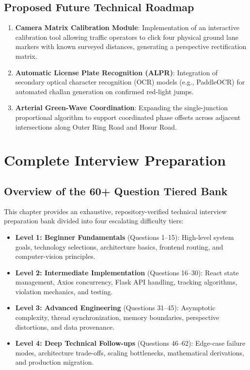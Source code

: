 \documentclass[11pt,a4paper,oneside]{report}
\begin{document}
\section{Proposed Future Technical Roadmap}
\begin{enumerate}[leftmargin=*]
    \item \textbf{Camera Matrix Calibration Module}: Implementation of an interactive calibration tool allowing traffic operators to click four physical ground lane markers with known surveyed distances, generating a perspective rectification matrix.
    \item \textbf{Automatic License Plate Recognition (ALPR)}: Integration of secondary optical character recognition (OCR) models (e.g., PaddleOCR) for automated challan generation on confirmed red-light jumps.
    \item \textbf{Arterial Green-Wave Coordination}: Expanding the single-junction proportional algorithm to support coordinated phase offsets across adjacent intersections along Outer Ring Road and Hosur Road.
\end{enumerate}



\chapter{Complete Interview Preparation}

\section{Overview of the 60+ Question Tiered Bank}
This chapter provides an exhaustive, repository-verified technical interview preparation bank divided into four escalating difficulty tiers:
\begin{itemize}[leftmargin=*]
    \item \textbf{Level 1: Beginner Fundamentals} (Questions 1--15): High-level system goals, technology selections, architecture basics, frontend routing, and computer-vision principles.
    \item \textbf{Level 2: Intermediate Implementation} (Questions 16--30): React state management, Axios concurrency, Flask API handling, tracking algorithms, violation mechanics, and testing.
    \item \textbf{Level 3: Advanced Engineering} (Questions 31--45): Asymptotic complexity, thread synchronization, memory boundaries, perspective distortions, and data provenance.
    \item \textbf{Level 4: Deep Technical Follow-ups} (Questions 46--62): Edge-case failure modes, architecture trade-offs, scaling bottlenecks, mathematical derivations, and production migration.
\end{itemize}
\end{document}
